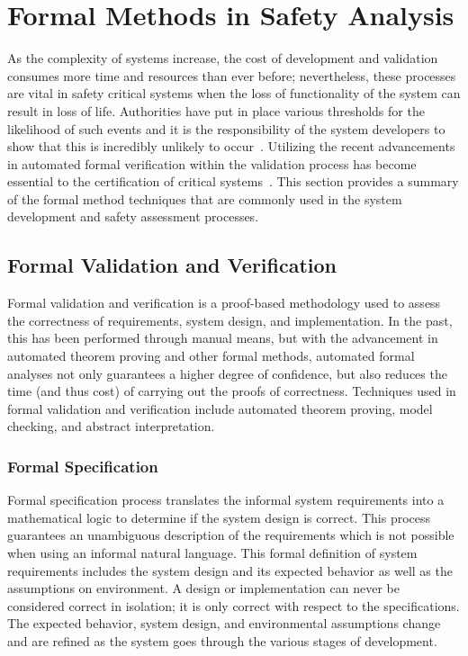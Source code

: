 \section{Formal Methods in Safety Analysis}
\label{sec:formalMethodsSA}
As the complexity of systems increase, the cost of development and validation consumes more time and resources than ever before; nevertheless, these processes are vital in safety critical systems when the loss of functionality of the system can result in loss of life. Authorities have put in place various thresholds for the likelihood of such events and it is the responsibility of the system developers to show that this is incredibly unlikely to occur~\cite{faaSA}. Utilizing the recent advancements in automated formal verification within the validation process has become essential to the certification of critical systems~\cite{deptOfDefense,standard1999,prasad2005survey}. This section provides a summary of the formal method techniques that are commonly used in the system development and safety assessment processes.

\subsection{Formal Validation and Verification}
Formal validation and verification is a proof-based methodology used to assess the correctness of requirements, system design, and implementation. In the past, this has been performed through manual means, but with the advancement in automated theorem proving and other formal methods, automated formal analyses not only guarantees a higher degree of confidence, but also reduces the time (and thus cost) of carrying out the proofs of correctness. Techniques used in formal validation and verification include automated theorem proving, model checking, and abstract interpretation. 

\subsubsection{Formal Specification}
Formal specification process translates the informal system requirements into a mathematical logic to determine if the system design is correct. This process guarantees an unambiguous description of the requirements which is not possible when using an informal natural language. This formal definition of system requirements includes the system design and its expected behavior as well as the assumptions on environment. A design or implementation can never be considered correct in isolation; it is only correct with respect to the specifications. The expected behavior, system design, and environmental assumptions change and are refined as the system goes through the various stages of development. 


